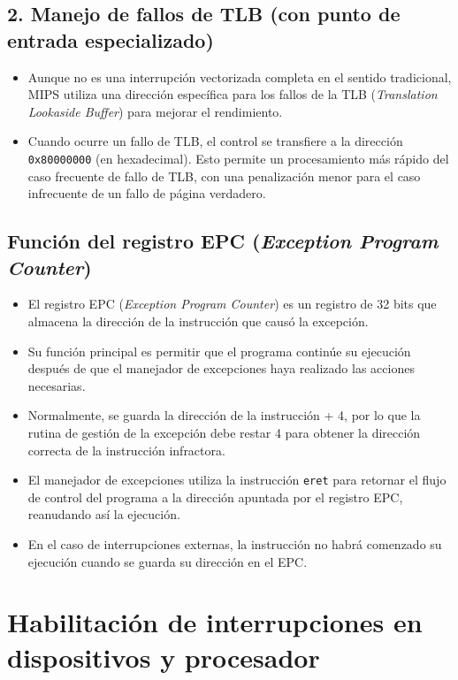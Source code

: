\documentclass{article}
\begin{document}
\subsection*{2. Manejo de fallos de TLB (con punto de entrada especializado)}
\begin{itemize}
    \item Aunque no es una interrupción vectorizada completa en el sentido tradicional, MIPS utiliza una dirección específica para los fallos de la TLB (\textit{Translation Lookaside Buffer}) para mejorar el rendimiento.
    \item Cuando ocurre un fallo de TLB, el control se transfiere a la dirección \texttt{0x80000000} (en hexadecimal). Esto permite un procesamiento más rápido del caso frecuente de fallo de TLB, con una penalización menor para el caso infrecuente de un fallo de página verdadero.
\end{itemize}

\subsection*{Función del registro EPC (\textit{Exception Program Counter})}
\begin{itemize}
    \item El registro EPC (\textit{Exception Program Counter}) es un registro de 32 bits que almacena la dirección de la instrucción que causó la excepción.
    \item Su función principal es permitir que el programa continúe su ejecución después de que el manejador de excepciones haya realizado las acciones necesarias.
    \item Normalmente, se guarda la dirección de la instrucción + 4, por lo que la rutina de gestión de la excepción debe restar 4 para obtener la dirección correcta de la instrucción infractora.
    \item El manejador de excepciones utiliza la instrucción \texttt{eret} para retornar el flujo de control del programa a la dirección apuntada por el registro EPC, reanudando así la ejecución.
    \item En el caso de interrupciones externas, la instrucción no habrá comenzado su ejecución cuando se guarda su dirección en el EPC.
\end{itemize}

\section{Habilitación de interrupciones en dispositivos y procesador}
\end{document}
